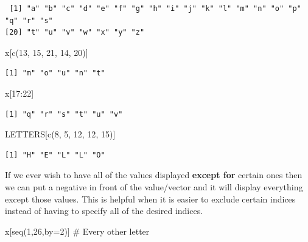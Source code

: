 \documentclass[
  letterpaper,
  DIV=11,
  numbers=noendperiod]{scrreprt}
\newenvironment{Shaded}{\begin{snugshade}}{\end{snugshade}}
\newcommand{\AttributeTok}[1]{\textcolor[rgb]{0.40,0.45,0.13}{#1}}
\newcommand{\CommentTok}[1]{\textcolor[rgb]{0.37,0.37,0.37}{#1}}
\newcommand{\DecValTok}[1]{\textcolor[rgb]{0.68,0.00,0.00}{#1}}
\newcommand{\FunctionTok}[1]{\textcolor[rgb]{0.28,0.35,0.67}{#1}}
\newcommand{\NormalTok}[1]{\textcolor[rgb]{0.00,0.23,0.31}{#1}}
\newcommand{\SpecialCharTok}[1]{\textcolor[rgb]{0.37,0.37,0.37}{#1}}
\begin{document}
\begin{verbatim}
 [1] "a" "b" "c" "d" "e" "f" "g" "h" "i" "j" "k" "l" "m" "n" "o" "p" "q" "r" "s"
[20] "t" "u" "v" "w" "x" "y" "z"
\end{verbatim}

\begin{Shaded}
\begin{Highlighting}[]
\NormalTok{x[}\FunctionTok{c}\NormalTok{(}\DecValTok{13}\NormalTok{, }\DecValTok{15}\NormalTok{, }\DecValTok{21}\NormalTok{, }\DecValTok{14}\NormalTok{, }\DecValTok{20}\NormalTok{)]}
\end{Highlighting}
\end{Shaded}

\begin{verbatim}
[1] "m" "o" "u" "n" "t"
\end{verbatim}

\begin{Shaded}
\begin{Highlighting}[]
\NormalTok{x[}\DecValTok{17}\SpecialCharTok{:}\DecValTok{22}\NormalTok{]}
\end{Highlighting}
\end{Shaded}

\begin{verbatim}
[1] "q" "r" "s" "t" "u" "v"
\end{verbatim}

\begin{Shaded}
\begin{Highlighting}[]
\NormalTok{LETTERS[}\FunctionTok{c}\NormalTok{(}\DecValTok{8}\NormalTok{, }\DecValTok{5}\NormalTok{, }\DecValTok{12}\NormalTok{, }\DecValTok{12}\NormalTok{, }\DecValTok{15}\NormalTok{)]}
\end{Highlighting}
\end{Shaded}

\begin{verbatim}
[1] "H" "E" "L" "L" "O"
\end{verbatim}

If we ever wish to have all of the values displayed \textbf{except for}
certain ones then we can put a negative in front of the value/vector and
it will display everything except those values. This is helpful when it
is easier to exclude certain indices instead of having to specify all of
the desired indices.

\begin{Shaded}
\begin{Highlighting}[]
\NormalTok{x[}\FunctionTok{seq}\NormalTok{(}\DecValTok{1}\NormalTok{,}\DecValTok{26}\NormalTok{,}\AttributeTok{by=}\DecValTok{2}\NormalTok{)] }\CommentTok{\# Every other letter}
\end{Highlighting}
\end{Shaded}
\end{document}
